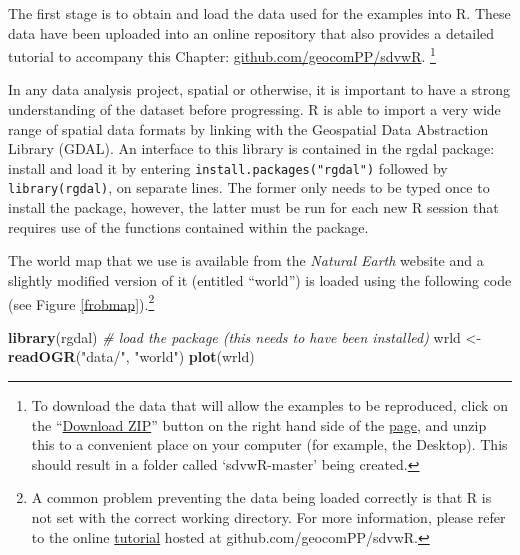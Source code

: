 \documentclass[]{article}
\newenvironment{Shaded}{}{}
\newcommand{\KeywordTok}[1]{\textcolor[rgb]{0.00,0.44,0.13}{\textbf{{#1}}}}
\newcommand{\StringTok}[1]{\textcolor[rgb]{0.25,0.44,0.63}{{#1}}}
\newcommand{\CommentTok}[1]{\textcolor[rgb]{0.38,0.63,0.69}{\textit{{#1}}}}
\newcommand{\NormalTok}[1]{{#1}}
\let\Oldincludegraphics\includegraphics
\renewcommand{\includegraphics}[1]{\Oldincludegraphics[width=10cm]{#1}}
\begin{document}
The first stage is to obtain and load the data used for the examples into R.
These data have been uploaded into
an online repository that also provides a detailed tutorial to accompany this
Chapter:
\href{https://github.com/geocomPP/sdvwR/blob/master/sdv-tutorial.pdf?raw=true}{
github.com/geocomPP/sdvwR}.
\footnote{To
download the data that will allow the examples to be reproduced, click
on the ``\href{https://github.com/geocomPP/sdvwR/archive/master.zip}{Download
ZIP}''
button on the right hand side of the
\href{https://github.com/geocomPP/sdvwR/}{page},
and unzip this to a
convenient place on your computer (for example, the Desktop). This should
result in a folder called `sdvwR-master' being created.}

In any data analysis project, spatial or otherwise, it is important to
have a strong understanding of the dataset before progressing. R is able to import a very wide range of spatial data formats by linking with the Geospatial Data Abstraction Library (GDAL). An interface to this library
is contained in the rgdal package: install and load it by entering
\texttt{install.packages("rgdal")} followed by
\texttt{library(rgdal)}, on separate lines. The former only needs to be
typed once to install the package, however, the latter must be
run for each new R session that requires use of the functions contained within
the package.

The world map that we use is available from the \emph{Natural Earth} website and
a
slightly modified version of it (entitled ``world'') is loaded using the
following code (see Figure \ref{frobmap}).\footnote{A
common problem preventing the data being loaded
correctly is that R is not set with the correct working directory.
For more information, please refer to the online
\href{https://github.com/geocomPP/sdvwR/blob/master/sdv-tutorial.pdf?raw=true}{tutorial}
hosted at github.com/geocomPP/sdvwR.}

\begin{Shaded}
\begin{Highlighting}[]
\KeywordTok{library}\NormalTok{(rgdal) }\CommentTok{# load the package (this needs to have been installed)}
\NormalTok{wrld <- }\KeywordTok{readOGR}\NormalTok{(}\StringTok{"data/"}\NormalTok{, }\StringTok{"world"}\NormalTok{)}
\KeywordTok{plot}\NormalTok{(wrld)}
\end{Highlighting}
\end{Shaded}
\end{document}
